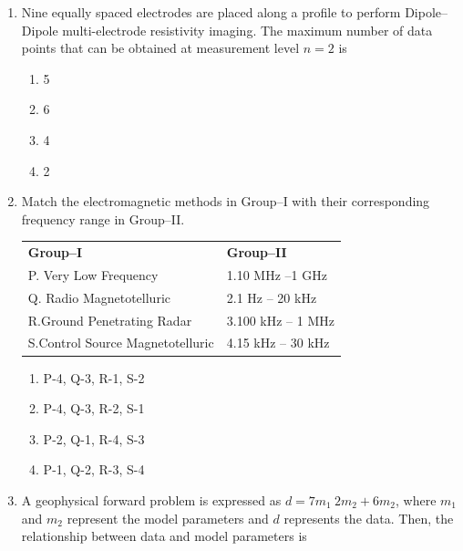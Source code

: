 \documentclass[journal,12pt,onecolumn]{IEEEtran}
\begin{document}
\begin{enumerate}
\item Nine equally spaced electrodes are placed along a profile to perform Dipole–Dipole multi-electrode resistivity imaging. The maximum number of data points that can be obtained at measurement level $n=2$ is  

\hfill{}

\begin{multicols}{4}
\begin{enumerate}
\item 5
\item 6
\item 4
\item 2
\end{enumerate}
\end{multicols}

\item Match the electromagnetic methods in Group–I with their corresponding frequency range in Group–II.  

\begin{tabular}{ll}
\textbf{Group–I} & \textbf{Group–II} \\
P. Very Low Frequency & 1.10 MHz –1 GHz \\
Q. Radio Magnetotelluric & 2.1 Hz – 20 kHz \\
R.Ground Penetrating Radar & 3.100 kHz – 1 MHz \\
S.Control Source Magnetotelluric & 4.15 kHz – 30 kHz \\
\end{tabular}  

\hfill{}

\begin{multicols}{2}
\begin{enumerate}
\item P-4, Q-3, R-1, S-2
\item P-4, Q-3, R-2, S-1
\item P-2, Q-1, R-4, S-3
\item P-1, Q-2, R-3, S-4
\end{enumerate}
\end{multicols}

\item A geophysical forward problem is expressed as $d = 7m_1\,^{\!}2 m_2 + 6m_2$, where $m_1$ and $m_2$ represent the model parameters and $d$ represents the data. Then, the relationship between data and model parameters is  

\hfill{}


\end{enumerate}
\end{document}
